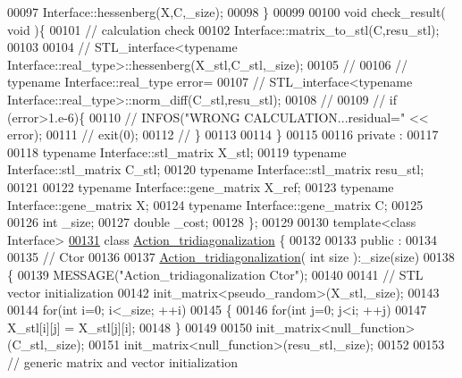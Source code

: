 \begin{DoxyCode}
00097       Interface::hessenberg(X,C,\_size);
00098   \}
00099 
00100   \textcolor{keywordtype}{void} check\_result( \textcolor{keywordtype}{void} )\{
00101     \textcolor{comment}{// calculation check}
00102     Interface::matrix\_to\_stl(C,resu\_stl);
00103 
00104 \textcolor{comment}{//     STL\_interface<typename Interface::real\_type>::hessenberg(X\_stl,C\_stl,\_size);}
00105 \textcolor{comment}{//}
00106 \textcolor{comment}{//     typename Interface::real\_type error=}
00107 \textcolor{comment}{//       STL\_interface<typename Interface::real\_type>::norm\_diff(C\_stl,resu\_stl);}
00108 \textcolor{comment}{//}
00109 \textcolor{comment}{//     if (error>1.e-6)\{}
00110 \textcolor{comment}{//       INFOS("WRONG CALCULATION...residual=" << error);}
00111 \textcolor{comment}{//       exit(0);}
00112 \textcolor{comment}{//     \}}
00113 
00114   \}
00115 
00116 private :
00117 
00118   \textcolor{keyword}{typename} Interface::stl\_matrix X\_stl;
00119   \textcolor{keyword}{typename} Interface::stl\_matrix C\_stl;
00120   \textcolor{keyword}{typename} Interface::stl\_matrix resu\_stl;
00121 
00122   \textcolor{keyword}{typename} Interface::gene\_matrix X\_ref;
00123   \textcolor{keyword}{typename} Interface::gene\_matrix X;
00124   \textcolor{keyword}{typename} Interface::gene\_matrix C;
00125 
00126   \textcolor{keywordtype}{int} \_size;
00127   \textcolor{keywordtype}{double} \_cost;
00128 \};
00129 
00130 \textcolor{keyword}{template}<\textcolor{keyword}{class} Interface>
\hyperlink{class_action__tridiagonalization}{00131} \textcolor{keyword}{class }\hyperlink{class_action__tridiagonalization}{Action\_tridiagonalization} \{
00132 
00133 public :
00134 
00135   \textcolor{comment}{// Ctor}
00136 
00137   \hyperlink{class_action__tridiagonalization}{Action\_tridiagonalization}( \textcolor{keywordtype}{int} size ):\_size(size)
00138   \{
00139     MESSAGE(\textcolor{stringliteral}{"Action\_tridiagonalization Ctor"});
00140 
00141     \textcolor{comment}{// STL vector initialization}
00142     init\_matrix<pseudo\_random>(X\_stl,\_size);
00143     
00144     \textcolor{keywordflow}{for}(\textcolor{keywordtype}{int} i=0; i<\_size; ++i)
00145     \{
00146       \textcolor{keywordflow}{for}(\textcolor{keywordtype}{int} j=0; j<i; ++j)
00147         X\_stl[i][j] = X\_stl[j][i];
00148     \}
00149     
00150     init\_matrix<null\_function>(C\_stl,\_size);
00151     init\_matrix<null\_function>(resu\_stl,\_size);
00152 
00153     \textcolor{comment}{// generic matrix and vector initialization}

\end{DoxyCode}
